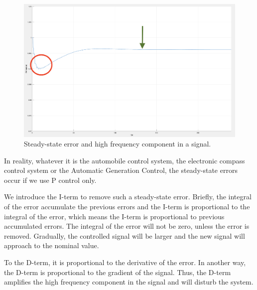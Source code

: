 \begin{figure}[t]
\center
\includegraphics[scale=0.3]{figure/3_2_steady.png}
\caption{Steady-state error and high frequency component in a signal.}
\label{3_2_steady}
\end{figure}

In reality, whatever it is the automobile control system, the electronic compass control system or the Automatic Generation Control, the steady-state errors occur if we use P control only. 

We introduce the I-term to remove such a steady-state error. Briefly, the integral of the error accumulate the previous errors and the I-term is proportional to the integral of the error, which means the I-term is proportional to previous accumulated errors. The integral of the error will not be zero, unless the error is removed. Gradually, the controlled signal will be larger and the new signal will approach to the nominal value. 

To the D-term, it is proportional to the derivative of the error. In another way, the D-term is proportional to the gradient of the signal. Thus, the D-term amplifies the high frequency component in the signal and will disturb the system. 